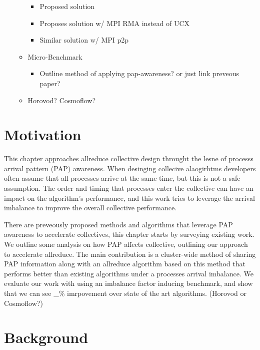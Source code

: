 \begin{itemize}
\begin{itemize}
        \begin{itemize}
            \item Proposed solution
            \item Proposes solution w/ MPI RMA instead of UCX
            \item Similar solution w/ MPI p2p \cite{Parsons2015ExpProcImbMPICollHierarcialSys, Patarasuk2008EffBcastDifProcArr}
        \end{itemize}
        \item Micro-Benchmark
            \begin{itemize}
                \item Outline method of applying pap-awareness? or just link preveous paper?
            \end{itemize}
        \item Horovod? Cosmoflow?
    \end{itemize}
\end{itemize}

\section{Motivation}

This chapter approaches allreduce collective design throught the lesne of processs arrival pattern (PAP) awareness. 
When desinging collecive alaogirhtms developers often assume that all processes arrive at the same time, but this is not a safe assumption.
The order and timing that processes enter the collective can have an impact on the algorithm's performance, and this work tries to leverage the arrival imbalance to improve the overall collective performance.

There are preveously proposed methods and algorithms that leverage PAP awareness to accelerate collectives, this chapter starts by surveying existing work.
We outline some analysis on how PAP affects collective, outlining our approach to accelerate allreduce.
The main contribution is a cluster-wide method of sharing PAP information along with an allreduce algorithm based on this method that performs better than existing algorithms under a processes arrival imbalance.
We evaluate our work with using an imbalance factor inducing benchmark, and show that we can see \_\% imrpovement over state of the art algorithms.  
(Horovod or Cosmoflow?)

\section{Background}

